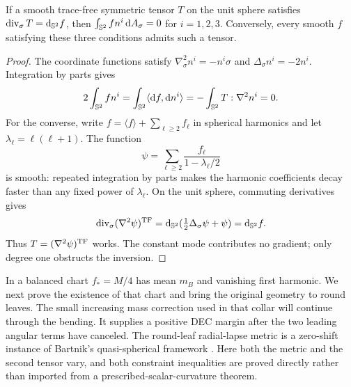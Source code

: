 \begin{lemma}\label{lem:obstruction}
If a smooth trace-free symmetric tensor $T$ on the unit sphere satisfies
$\operatorname{div}_\sigma T=\mathrm d_{\mathbb S^2}f$, then
$\int_{\mathbb S^2}fn^i\,\mathrm dA_\sigma=0$ for $i=1,2,3$.
Conversely, every smooth $f$ satisfying these three conditions admits
such a tensor.
\end{lemma}
\begin{proof}
The coordinate functions satisfy
$\nabla_\sigma^2n^i=-n^i\sigma$ and $\Delta_\sigma n^i=-2n^i$.
Integration by parts gives
\[
 2\int_{\mathbb S^2}fn^i
   =\int_{\mathbb S^2}\langle\mathrm df,\mathrm dn^i\rangle
   =-\int_{\mathbb S^2}T:\nabla^2n^i=0.
\]
For the converse, write $f=\langle f\rangle+\sum_{\ell\geq2}f_\ell$
in spherical harmonics and let $\lambda_\ell=\ell(\ell+1)$.
The function
\[
 \psi=\sum_{\ell\geq2}\frac{f_\ell}{1-\lambda_\ell/2}
\]
is smooth: repeated integration by parts makes the harmonic
coefficients decay faster than any fixed power of $\lambda_\ell$.
On the unit sphere, commuting derivatives gives
\[
 \operatorname{div}_\sigma(\nabla^2\psi)^{\mathrm{TF}}
       =\mathrm d_{\mathbb S^2}(\tfrac12\Delta_\sigma\psi+\psi)
       =\mathrm d_{\mathbb S^2}f.
\]
Thus $T=(\nabla^2\psi)^{\mathrm{TF}}$ works. The constant mode contributes
no gradient; only degree one obstructs the inversion.
\end{proof}

In a balanced chart $f_*=M/4$ has mean $m_B$ and vanishing first
harmonic. We next prove the existence of that chart and bring the
original geometry to round leaves. The small increasing mass correction
used in that collar will continue through the bending. It supplies a
positive DEC margin after the two leading angular terms have canceled.
The round-leaf radial-lapse metric is a zero-shift instance of Bartnik's
quasi-spherical framework \cite{Bartnik,BartnikICM}. Here both the metric
and the second tensor vary, and both constraint inequalities are proved
directly rather than imported from a prescribed-scalar-curvature theorem.
